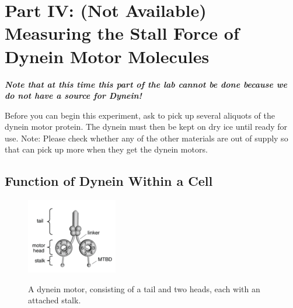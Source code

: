 \documentclass{../lab}
\begin{document}

\section{Part IV: (Not Available) Measuring the Stall Force of Dynein Motor Molecules}

\emph{\textbf{Note that at this time this part of the lab cannot be done because we do not have a source for Dynein!}}

Before you can begin this experiment, ask \LabEngineer to pick up several aliquots of the dynein motor protein. The dynein must then be kept on dry ice until ready for use.  Note: Please check whether any of the other materials are out of supply so that \LabEngineer can pick up more when they get the dynein motors.

\subsection{Function of Dynein Within a Cell}

\begin{figure}[h]
    \centering
    \href{http://experimentationlab.berkeley.edu/sites/default/files/images/150px-Dynein_Motor.gif}{\includegraphics[width=0.5\linewidth]{images/150px-Dynein_Motor.png}}
    \caption{A dynein motor, consisting of a tail and two heads, each with an attached stalk.}
    \label{fig:150px-Dynein_Motor}
\end{figure}
\end{document}
